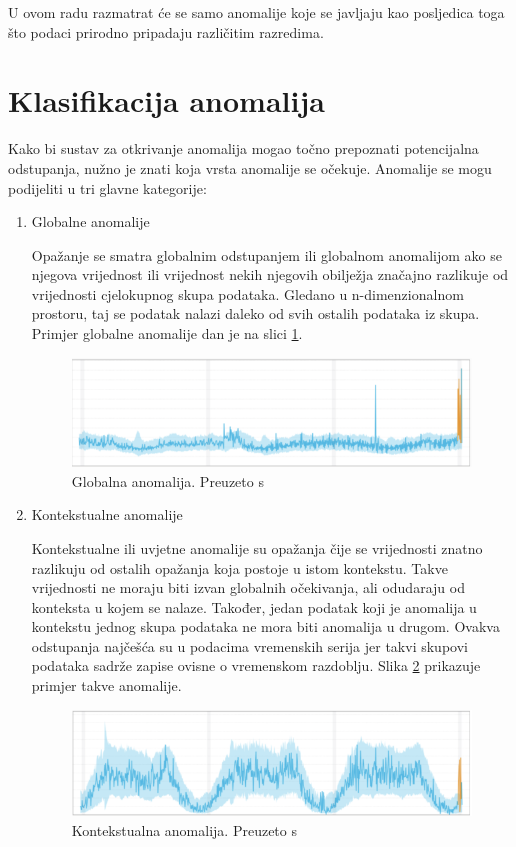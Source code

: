 \documentclass[utf8, diplomski, numeric]{fer}
\begin{document}
U ovom radu razmatrat će se samo anomalije koje se javljaju kao posljedica toga što podaci prirodno pripadaju različitim razredima.

\section{Klasifikacija anomalija}
Kako bi sustav za otkrivanje anomalija mogao točno prepoznati potencijalna odstupanja, nužno je znati koja vrsta anomalije se očekuje. Anomalije se mogu podijeliti u tri glavne kategorije:

\begin{enumerate}
\item Globalne anomalije

Opažanje se smatra globalnim odstupanjem ili globalnom anomalijom ako se njegova vrijednost ili vrijednost nekih njegovih obilježja značajno razlikuje od vrijednosti cjelokupnog skupa podataka. Gledano u n-dimenzionalnom prostoru, taj se podatak nalazi daleko od svih ostalih podataka iz skupa. Primjer globalne anomalije dan je na slici \ref{fig:outlier1}.

\begin{figure}[htb]
\includegraphics[width=1\textwidth]{images/outlier_type1.png}
\centering
\caption{Globalna anomalija. Preuzeto s  \cite{OutlierAnalysis}}
\label{fig:outlier1}
\end{figure}

\item Kontekstualne anomalije

Kontekstualne ili uvjetne anomalije su opažanja čije se vrijednosti znatno razlikuju od ostalih opažanja koja postoje u istom kontekstu. Takve vrijednosti ne moraju biti izvan globalnih očekivanja, ali odudaraju od konteksta u kojem se nalaze. Također, jedan podatak koji je anomalija u kontekstu jednog skupa podataka ne mora biti anomalija u drugom. Ovakva odstupanja najčešća su u podacima vremenskih serija jer takvi skupovi podataka sadrže zapise ovisne o vremenskom razdoblju. Slika \ref{fig:outlier2} prikazuje primjer takve anomalije.

\begin{figure}[htb]
\includegraphics[width=1\textwidth]{images/outlier_type2.png}
\centering
\caption{Kontekstualna anomalija. Preuzeto s  \cite{OutlierAnalysis}}
\label{fig:outlier2}
\end{figure}


\end{enumerate}
\end{document}
